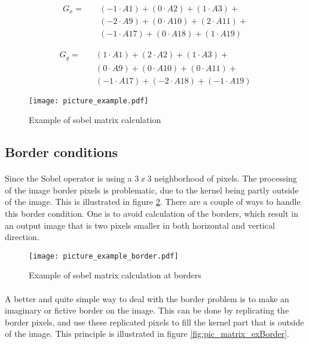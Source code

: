 \begin{equation}
\begin{split}
	G_x = \quad &(-1\cdot A1 ) + (0\cdot A2) + (1\cdot A3) + \\
		  &(-2\cdot A9 ) + (0\cdot A10) + (2\cdot A11)	+  \\
		  &(-1\cdot A17) + (0\cdot A18) + (1\cdot A19)
\end{split}
\label{eq:sobel_Gx}
\end{equation}

\begin{equation}
\begin{split}
	G_y = \quad & (1\cdot A1) + (2\cdot A2) + (1\cdot A3) + \\
		 &  (0\cdot A9) + (0\cdot A10) + (0\cdot A11)	+  \\
		 &  (-1\cdot A17) + (-2\cdot A18) + (-1\cdot A19)
\end{split}
\label{eq:sobel_Gy}
\end{equation}

\begin{figure}[H]
	\centering
	\texttt{[image: picture\_example.pdf]}
	\caption{Example of sobel matrix calculation}
	\label{fig:pic_matrix}
\end{figure}

\subsection{Border conditions}
\paragraph*{}
Since the Sobel operator is using a $3~x~3$ neighborhood of pixels. The processing of the image border pixels is problematic, due to the kernel being partly outside of the image. This is illustrated in figure \ref{fig:pic_matrix_border}.
There are a couple of ways to handle this border condition. One is to avoid calculation of the borders, which result in an output image that is two pixels smaller in both horizontal and vertical direction.

\begin{figure}[H]
	\centering
	\texttt{[image: picture\_example\_border.pdf]}
	\caption{Example of sobel matrix calculation at borders}
	\label{fig:pic_matrix_border}
\end{figure}

\paragraph*{}
A better and quite simple way to deal with the border problem is to make an imaginary or fictive border on the image. This can be done by replicating the border pixels, and use these replicated pixels to fill the kernel part that is outside of the image. This principle is illustrated in figure \ref{fig:pic_matrix_exBorder}.

